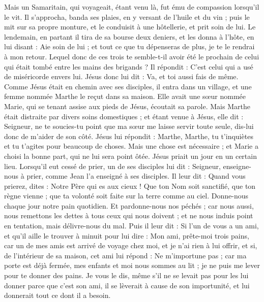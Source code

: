 \begin{multicols}{2}
Mais un Samaritain, qui voyageait, étant venu là, fut ému de compassion lorsqu'il le vit.
Il s'approcha, banda ses plaies, en y versant de l'huile et du vin ; puis le mit sur sa propre monture, et le conduisit à une hôtellerie, et prit soin de lui.
Le lendemain, en partant il tira de sa bourse deux deniers, et les donna à l'hôte, en lui disant : Aie soin de lui ; et tout ce que tu dépenseras de plus, je te le rendrai à mon retour.
Lequel donc de ces trois te semble-t-il avoir été le prochain de celui qui était tombé entre les mains des brigands ?
Il répondit : C'est celui qui a usé de miséricorde envers lui. Jésus donc lui dit : Va, et toi aussi fais de même.
Comme Jésus était en chemin avec ses disciples, il entra dans un village, et une femme nommée Marthe le reçut dans sa maison.
Elle avait une sœur nommée Marie, qui se tenant assise aux pieds de Jésus, écoutait sa parole.
Mais Marthe était distraite par divers soins domestiques ; et étant venue à Jésus, elle dit : Seigneur, ne te soucies-tu point que ma sœur me laisse servir toute seule, dis-lui donc de m'aider de son côté.
Jésus lui répondit : Marthe, Marthe, tu t'inquiètes et tu t'agites pour beaucoup de choses.
Mais une chose est nécessaire ; et Marie a choisi la bonne part, qui ne lui sera point ôtée.
\VerseOne{}Jésus priait un jour en un certain lieu. Lorsqu'il eut cessé de prier, un de ses disciples lui dit : Seigneur, enseigne-nous à prier, comme Jean l'a enseigné à ses disciples.
Il leur dit : Quand vous prierez, dites : Notre Père qui es aux cieux ! Que ton Nom soit sanctifié, que ton règne vienne ; que ta volonté soit faite sur la terre comme au ciel.
Donne-nous chaque jour notre pain quotidien.
Et pardonne-nous nos péchés ; car nous aussi, nous remettons les dettes à tous ceux qui nous doivent ; et ne nous induis point en tentation, mais délivre-nous du mal.
Puis il leur dit : Si l'un de vous a un ami, et qu'il aille le trouver à minuit pour lui dire : Mon ami, prête-moi trois pains,
car un de mes amis est arrivé de voyage chez moi, et je n'ai rien à lui offrir,
et si, de l'intérieur de sa maison, cet ami lui répond : Ne m'importune pas ; car ma porte est déjà fermée, mes enfants et moi nous sommes au lit ; je ne puis me lever pour te donner des pains.
Je vous le dis, même s'il ne se levait pas pour les lui donner parce que c'est son ami, il se lèverait à cause de son importunité, et lui donnerait tout ce dont il a besoin.

\end{multicols}
